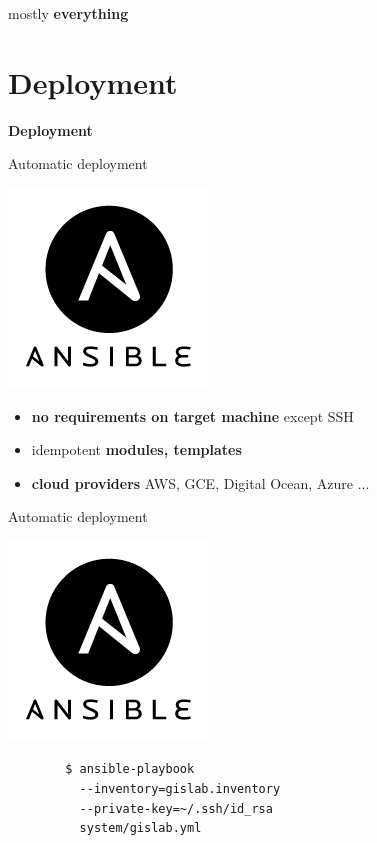 \documentclass[12pt]{beamer}
\begin{document}
\begin{frame}
	\begin{center}
		mostly \textbf{everything}
	\end{center}
\end{frame}


\section{Deployment}
\begin{frame}
	\begin{center}
		\LARGE\textbf{Deployment}	
	\end{center}
\end{frame}

\begin{frame}{Automatic deployment}
	\begin{center}
		\includegraphics[keepaspectratio=true,height=0.4\textheight]{images/ansible.png}
	\end{center}
	\begin{itemize}
		\item \textbf{no requirements on target machine} except SSH
		\item idempotent \textbf{modules, templates}
		\item \textbf{cloud providers} AWS, GCE, Digital Ocean, Azure ...
	\end{itemize}
\end{frame}

\begin{frame}[fragile]{Automatic deployment}
	\begin{center}
		\includegraphics[keepaspectratio=true,height=0.4\textheight]{images/ansible.png}
	\end{center}

   \lstset{language=sh}
	\begin{lstlisting}
		$ ansible-playbook
		  --inventory=gislab.inventory
		  --private-key=~/.ssh/id_rsa
		  system/gislab.yml
	\end{lstlisting}
\end{frame}
\end{document}
